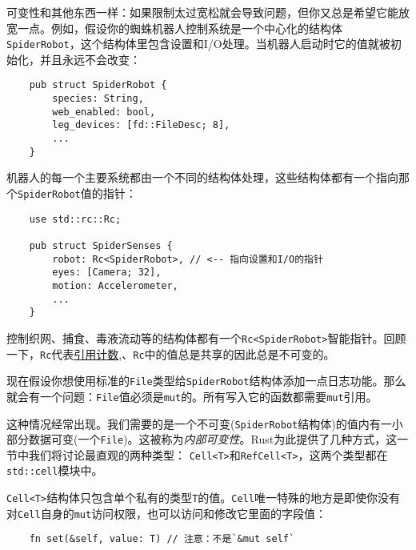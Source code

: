 可变性和其他东西一样：如果限制太过宽松就会导致问题，但你又总是希望它能放宽一点。例如，假设你的蜘蛛机器人控制系统是一个中心化的结构体\texttt{SpiderRobot}，这个结构体里包含设置和I/O处理。当机器人启动时它的值就被初始化，并且永远不会改变：
\begin{verbatim}
    pub struct SpiderRobot {
        species: String,
        web_enabled: bool,
        leg_devices: [fd::FileDesc; 8],
        ...
    }
\end{verbatim}

机器人的每一个主要系统都由一个不同的结构体处理，这些结构体都有一个指向那个\texttt{SpiderRobot}值的指针：
\begin{verbatim}
    use std::rc::Rc;

    pub struct SpiderSenses {
        robot: Rc<SpiderRobot>, // <-- 指向设置和I/O的指针
        eyes: [Camera; 32],
        motion: Accelerometer,
        ...
    }
\end{verbatim}

控制织网、捕食、毒液流动等的结构体都有一个\texttt{Rc<SpiderRobot>}智能指针。回顾一下，\texttt{Rc}代表\hyperref[rc]{引用计数},、\texttt{Rc}中的值总是共享的因此总是不可变的。

现在假设你想使用标准的\texttt{File}类型给\texttt{SpiderRobot}结构体添加一点日志功能。那么就会有一个问题：\texttt{File}值必须是\texttt{mut}的。所有写入它的函数都需要\texttt{mut}引用。

这种情况经常出现。我们需要的是一个不可变(\texttt{SpiderRobot}结构体)的值内有一小部分数据可变(一个\texttt{File})。这被称为\emph{内部可变性}。Rust为此提供了几种方式，这一节中我们将讨论最直观的两种类型：
\texttt{Cell<T>}和\texttt{RefCell<T>}，这两个类型都在\texttt{std::cell}模块中。

\texttt{Cell<T>}结构体只包含单个私有的类型\texttt{T}的值。\texttt{Cell}唯一特殊的地方是即使你没有对\texttt{Cell}自身的\texttt{mut}访问权限，也可以访问和修改它里面的字段值：



\begin{verbatim}
    fn set(&self, value: T) // 注意：不是`&mut self`
\end{verbatim}

